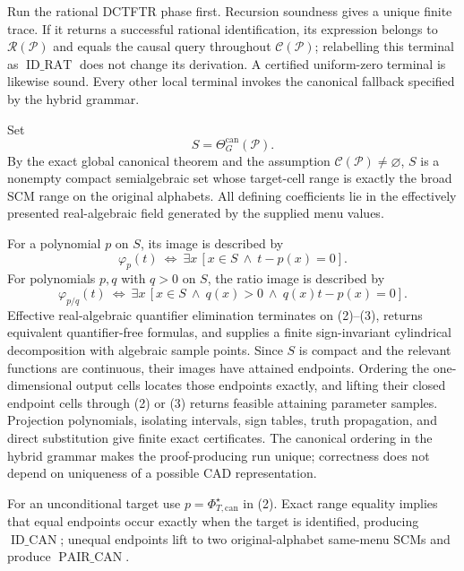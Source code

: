 Run the rational DCTFTR phase first. Recursion soundness gives a unique finite trace. If it returns a successful rational identification, its expression belongs to \(\mathscr R(\mathcal P)\) and equals the causal query throughout \(\mathcal C(\mathcal P)\); relabelling this terminal as \(\operatorname{ID\_RAT}\) does not change its derivation. A certified uniform-zero terminal is likewise sound. Every other local terminal invokes the canonical fallback specified by the hybrid grammar.

Set
\[
S=\Theta_G^{\mathrm{can}}(\mathcal P).\tag{1}
\]
By the exact global canonical theorem and the assumption
\(\mathcal C(\mathcal P)\ne\varnothing\), \(S\) is a nonempty compact semialgebraic set whose target-cell range is exactly the broad SCM range on the original alphabets. All defining coefficients lie in the effectively presented real-algebraic field generated by the supplied menu values.

For a polynomial \(p\) on \(S\), its image is described by
\[
\varphi_p(t)\ \Longleftrightarrow\ \exists x\,[x\in S\ \wedge\ t-p(x)=0].\tag{2}
\]
For polynomials \(p,q\) with \(q>0\) on \(S\), the ratio image is described by
\[
\varphi_{p/q}(t)\ \Longleftrightarrow\ \exists x\,[x\in S\ \wedge\ q(x)>0\ \wedge\ q(x)t-p(x)=0].\tag{3}
\]
Effective real-algebraic quantifier elimination terminates on (2)--(3), returns equivalent quantifier-free formulas, and supplies a finite sign-invariant cylindrical decomposition with algebraic sample points. Since \(S\) is compact and the relevant functions are continuous, their images have attained endpoints. Ordering the one-dimensional output cells locates those endpoints exactly, and lifting their closed endpoint cells through (2) or (3) returns feasible attaining parameter samples. Projection polynomials, isolating intervals, sign tables, truth propagation, and direct substitution give finite exact certificates. The canonical ordering in the hybrid grammar makes the proof-producing run unique; correctness does not depend on uniqueness of a possible CAD representation.

For an unconditional target use
\(p=\Phi_{T,\mathrm{can}}^\star\) in (2). Exact range equality implies that equal endpoints occur exactly when the target is identified, producing \(\operatorname{ID\_CAN}\); unequal endpoints lift to two original-alphabet same-menu SCMs and produce \(\operatorname{PAIR\_CAN}\).

